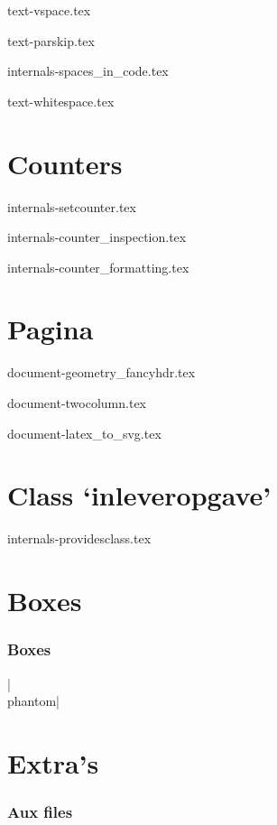 \documentclass{cursuspresentatie}
\def\importslide#1#2{%
    {#2}
}
\begin{document}
    \importslide{text}{text-vspace.tex}

    \importslide{text}{text-parskip.tex}

    \importslide{internals}{internals-spaces_in_code.tex}

	\importslide{text}{text-whitespace.tex}

    \section{Counters}

    \importslide{internals}{internals-setcounter.tex}

    \importslide{internals}{internals-counter_inspection.tex}

    \importslide{internals}{internals-counter_formatting.tex}

    \section{Pagina}

    \importslide{document}{document-geometry_fancyhdr.tex}

    \importslide{document}{document-twocolumn.tex}

    \importslide{document}{document-latex_to_svg.tex}

    \section{Class `inleveropgave'}

    \importslide{internals}{internals-providesclass.tex}

    \section{Boxes}
    \begin{frame}
        \frametitle{Boxes}
    \end{frame}

    \begin{frame}
        \hll|\\phantom|
    \end{frame}

    \section{Extra's}

    \begin{frame}
        \frametitle{Aux files}
    \end{frame}
\end{document}
